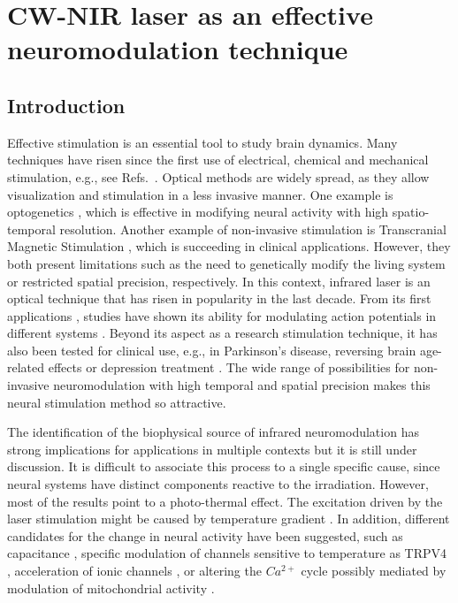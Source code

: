 \chapter{CW-NIR laser as an effective neuromodulation technique}
\label{c-laser}
\section{Introduction}

Effective  stimulation is an essential tool to study brain dynamics. Many techniques have risen since the first use of  electrical, chemical and mechanical stimulation, e.g., see Refs.~. Optical methods are widely spread, as they allow visualization \cite{Lecoq9042} and stimulation in a less invasive manner. One example is optogenetics \cite{Boyden2005, Yizhar2011, Tye2012,bansal2022towards}, which is effective in modifying neural activity with high spatio-temporal resolution. Another example of non-invasive stimulation is Transcranial Magnetic Stimulation \cite{Valero2017transcranial}, which is succeeding in clinical applications. However, they both present limitations such as the need to genetically modify the living system or restricted spatial precision, respectively. In this context, infrared laser is an optical technique that has risen in popularity in the last decade. From its first applications \cite{Wells2005, Izzo2007}, studies have shown its ability for modulating action potentials in different systems \cite{Liang2009, Goyal2012, Brown2020, Barrett2018, Shapiro2012, Cayce2014, Begeng2022}. Beyond its aspect as a research stimulation technique, it has also been tested for clinical use, e.g., in Parkinson's disease, reversing brain age-related effects or depression treatment \cite{Konstantinovic2013, DISNER2016780, Wang2017, Saucedo2021, Pan2023}. The wide range of possibilities for non-invasive neuromodulation with high temporal and spatial precision makes this neural stimulation method so attractive. 
 
The identification of the biophysical source of infrared neuromodulation has strong implications for applications in multiple contexts but it is still under discussion. It is difficult to associate this process to a single specific cause, since neural systems have distinct components reactive to the irradiation. However, most of the results point to a photo-thermal effect. The excitation driven by the laser stimulation might be caused by temperature gradient \cite{Wells2007}. In addition, different candidates for the change in neural activity have been suggested, such as capacitance \cite{Shapiro2012, Plaksin2018}, specific modulation of channels sensitive to temperature as TRPV4 \cite{Albert2012}, acceleration of ionic channels \cite{Liang2009}, or altering the $Ca^{2+}$ cycle possibly mediated by modulation of mitochondrial activity \cite{Dittami2011, Lumbreras2014, Saucedo2021}.


